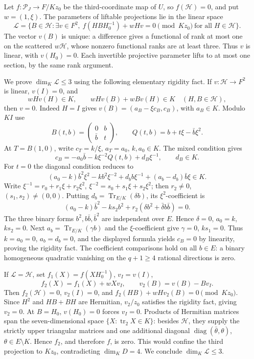 \documentclass[12pt,letterpaper,onecolumn]{article}
\theoremstyle{definition}
\theoremstyle{remark}
\DeclareMathOperator{\Tr}{Tr}
\begin{document}
Let \(f:\mathcal P_J\to F/Kz_0\) be the third-coordinate map of \(U\), so \(f(\mathcal H)=0\), and put \(w=(1,\xi)\).
The parameters of liftable projections lie in the linear space
\[
\mathscr L=\{B\in\mathcal H:\exists v\in F^2,
\ f(HBH_0^{-1})+wHv=0\pmod{Kz_0}\ \text{for all }H\in\mathcal H\}.
\]
The vector \(v(B)\) is unique: a difference gives a functional of rank at most one on the scattered \(w\mathcal H\), whose nonzero functional ranks are at least three.
Thus \(v\) is linear, with \(v(H_0)=0\). Each invertible projective parameter lifts to at most one section, by the same rank argument.

We prove \(\dim_K\mathscr L\le3\) using the following elementary rigidity fact.
If \(v:\mathcal H\to F^2\) is linear, \(v(I)=0\), and
\[
wHv(H)\in K,\qquad wHv(B)+wBv(H)\in K\quad(H,B\in\mathcal H),
\]
then \(v=0\).
Indeed \(H=I\) gives \(v(B)=(a_B-\xi c_B,c_B)\), with \(a_B\in K\).
Modulo \(KI\) use
\[
B(t,b)=\begin{pmatrix}0&b\\\bar b&t\end{pmatrix},
\qquad Q(t,b)=b+t\xi-\bar b\xi^2.
\]
At \(T=B(1,0)\), write \(c_T=k/\xi\), \(a_T=a_0\), \(k,a_0\in K\).
The mixed condition gives
\[
c_B=-a_0\bar b-k\xi^{-2}Q(t,b)+d_B\xi^{-1},\qquad d_B\in K.
\]
For \(t=0\) the diagonal condition reduces to
\[
(a_0-k)\bar b^2\xi^2-kb^2\xi^{-2}
+d_bb\xi^{-1}+(a_b-d_b)\bar b\xi\in K.
\]
Write \(\xi^{-1}=r_0+r_1\xi+r_2\xi^2\),
\(\xi^{-2}=s_0+s_1\xi+s_2\xi^2\); then \(r_2\ne0\), \((s_1,s_2)\ne(0,0)\).
Putting \(d_b=\Tr_{E/K}(\delta b)\), its \(\xi^2\)-coefficient is
\[
(a_0-k)\bar b^2-ks_2b^2+r_2(\delta b^2+\bar\delta b\bar b)=0.
\]
The three binary forms \(b^2,b\bar b,\bar b^2\) are independent over \(E\). Hence \(\delta=0\), \(a_0=k\), \(ks_2=0\).
Next \(a_b=\Tr_{E/K}(\gamma b)\) and the \(\xi\)-coefficient give \(\gamma=0\), \(ks_1=0\).
Thus \(k=a_0=0\), \(a_b=d_b=0\), and the displayed formula yields \(c_B=0\) by linearity, proving the rigidity fact. The coefficient comparisons hold on all \(b\in E\): a binary homogeneous quadratic vanishing on the \(q+1\ge4\) rational directions is zero.

If \(\mathscr L=\mathcal H\), set \(f_1(X)=f(XH_0^{-1})\), \(v_I=v(I)\),
\[
f_2(X)=f_1(X)+wXv_I,
\qquad v_2(B)=v(B)-Bv_I.
\]
Then \(f_2(\mathcal H)=0\), \(v_2(I)=0\), and
\(f_2(HB)+wHv_2(B)=0\pmod{Kz_0}\).
Since \(H^2\) and \(HB+BH\) are Hermitian, \(v_2/z_0\) satisfies the rigidity fact, giving \(v_2=0\).
At \(B=H_0\), \(v(H_0)=0\) forces \(v_I=0\). Products of Hermitian matrices span the seven-dimensional space \(\{X:\operatorname{tr}_2X\in K\}\): besides \(\mathcal H\), they supply the strictly upper triangular matrices and one additional diagonal \(\operatorname{diag}(\bar\theta,\theta)\), \(\theta\in E\setminus K\).
Hence \(f_2\), and therefore \(f\), is zero. This would confine the third projection to \(Kz_0\), contradicting \(\dim_KD=4\).
We conclude \(\dim_K\mathscr L\le3\).
\end{document}
